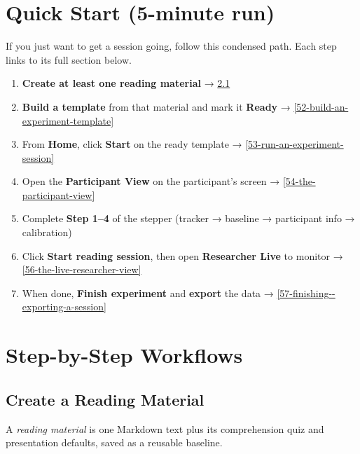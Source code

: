 \FloatBarrier
\section{Quick Start (5-minute run)}\label{4-quick-start-5-minute-run}

If you just want to get a session going, follow this condensed path. Each step links to its full
section below.

\begin{enumerate}
\def\labelenumi{\arabic{enumi}.}
\tightlist
\item
  \textbf{Create at least one reading material} → \cref{51-create-a-reading-material}
\item
  \textbf{Build a template} from that material and mark it \textbf{Ready} → \cref{52-build-an-experiment-template}
\item
  From \textbf{Home}, click \textbf{Start} on the ready template → \cref{53-run-an-experiment-session}
\item
  Open the \textbf{Participant View} on the participant's screen → \cref{54-the-participant-view}
\item
  Complete \textbf{Step 1--4} of the stepper (tracker → baseline → participant info → calibration)
\item
  Click \textbf{Start reading session}, then open \textbf{Researcher Live} to monitor → \cref{56-the-live-researcher-view}
\item
  When done, \textbf{Finish experiment} and \textbf{export} the data → \cref{57-finishing--exporting-a-session}
\end{enumerate}

\FloatBarrier
\section{Step-by-Step Workflows}\label{5-step-by-step-workflows}

\subsection{Create a Reading Material}\label{51-create-a-reading-material}

A \emph{reading material} is one Markdown text plus its comprehension quiz and presentation defaults,
saved as a reusable baseline.

